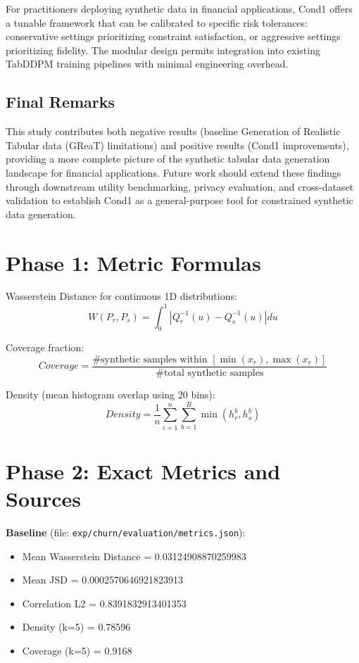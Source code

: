 \documentclass[10pt,conference,a4paper]{IEEEtran}
\begin{document}
For practitioners deploying synthetic data in financial applications, Cond1 offers a tunable framework that can be calibrated to specific risk tolerances: conservative settings prioritizing constraint satisfaction, or aggressive settings prioritizing fidelity. The modular design permits integration into existing TabDDPM training pipelines with minimal engineering overhead.

\subsection{Final Remarks}
This study contributes both negative results (baseline Generation of Realistic Tabular data (GReaT) limitations) and positive results (Cond1 improvements), providing a more complete picture of the synthetic tabular data generation landscape for financial applications. Future work should extend these findings through downstream utility benchmarking, privacy evaluation, and cross-dataset validation to establish Cond1 as a general-purpose tool for constrained synthetic data generation. 

\appendices

\section{Phase 1: Metric Formulas}
Wasserstein Distance for continuous 1D distributions:
\begin{equation}
W(P_{r},P_{s})=\int_{0}^{1}|Q_{r}^{-1}(u)-Q_{s}^{-1}(u)|du \label{eq:wasserstein_1d}
\end{equation}

Coverage fraction:
\begin{equation}
Coverage = \frac{\text{\# synthetic samples within } [\min(x_{r}),\max(x_{r})]}{\text{\# total synthetic samples}} \label{eq:coverage}
\end{equation}

Density (mean histogram overlap using 20 bins):
\begin{equation}
Density=\frac{1}{n}\sum_{i=1}^{n}\sum_{b=1}^{B}\min(h_{r}^{b},h_{s}^{b}) \label{eq:density}
\end{equation}

\section{Phase 2: Exact Metrics and Sources}
\textbf{Baseline} (file: \texttt{exp/churn/evaluation/metrics.json}):
\begin{itemize}
    \item Mean Wasserstein Distance = 0.03124908870259983
    \item Mean JSD = 0.0002570646921823913
    \item Correlation L2 = 0.8391832913401353
    \item Density (k=5) = 0.78596
    \item Coverage (k=5) = 0.9168
\end{itemize}
\end{document}
